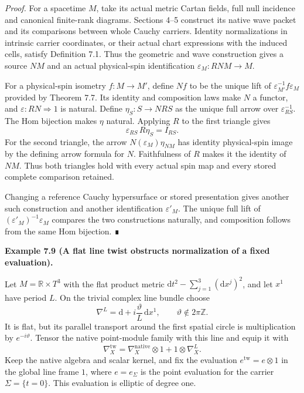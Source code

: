 \documentclass[
  english,
  11pt,
  reqno]{amsart}
\makeatletter
\newcommand{\pandocstatementheading}[1]{%
  \par\addpenalty{\@beginparpenalty}%
  \addvspace{.5\baselineskip plus .2\baselineskip minus .2\baselineskip}%
  {\normalfont\bfseries #1\par}%
  \nobreak\@afterindenttrue\@afterheading
}
\makeatother
\begin{document}
\emph{Proof.} For a spacetime \(M\), take its actual metric Cartan
fields, full null incidence and canonical finite-rank diagrams. Sections
4--5 construct its native wave packet and its comparisons between whole
Cauchy carriers. Identity normalizations in intrinsic carrier
coordinates, or their actual chart expressions with the induced cells,
satisfy Definition 7.1. Thus the geometric and wave construction gives a
source \(N M\) and an actual physical-spin identification
\(\varepsilon_M:R N M\to M\).

For a physical-spin isometry \(f:M\to M'\), define \(Nf\) to be the
unique lift of \(\varepsilon_{M'}^{-1}f\varepsilon_M\) provided by
Theorem 7.7. Its identity and composition laws make \(N\) a functor, and
\(\varepsilon:RN\Rightarrow1\) is natural. Define \(\eta_S:S\to NRS\) as
the unique full arrow over \(\varepsilon_{RS}^{-1}\). The Hom bijection
makes \(\eta\) natural. Applying \(R\) to the first triangle gives \[
\varepsilon_{RS}\,R\eta_S=I_{RS}.
\] For the second triangle, the arrow \(N(\varepsilon_M)\eta_{NM}\) has
identity physical-spin image by the defining arrow formula for \(N\).
Faithfulness of \(R\) makes it the identity of \(NM\). Thus both
triangles hold with every actual spin map and every stored complete
comparison retained.

Changing a reference Cauchy hypersurface or stored presentation gives
another such construction and another identification \(\varepsilon'_M\).
The unique full lift of \((\varepsilon'_M)^{-1}\varepsilon_M\) compares
the two constructions naturally, and composition follows from the same
Hom bijection. ∎

\pandocstatementheading{\protect{}\label{ex:global-flat-line-normalization}Example 7.9 (A flat line twist obstructs normalization of a fixed
evaluation).}

Let \(M=\mathbb R\times T^3\) with the flat product metric
\(\mathrm dt^2-\sum_{j=1}^3(\mathrm dx^j)^2\), and let \(x^1\) have
period \(L\). On the trivial complex line bundle choose \[
\nabla^L=\mathrm d+i\frac{\vartheta}{L}\,\mathrm dx^1,
\qquad \vartheta\notin2\pi\mathbb Z.
\] It is flat, but its parallel transport around the first spatial
circle is multiplication by \(e^{-i\vartheta}\). Tensor the native
point-module family with this line and equip it with \[
\nabla^{\mathrm{tw}}_X
=\nabla^{\mathrm{native}}_X\otimes1
 +1\otimes\nabla^L_X.
\] Keep the native algebra and scalar kernel, and fix the evaluation
\(e^{\mathrm{tw}}=e\otimes1\) in the global line frame \(1\), where
\(e=e_\Sigma\) is the point evaluation for the carrier
\(\Sigma=\{t=0\}\). This evaluation is elliptic of degree one.
\end{document}
